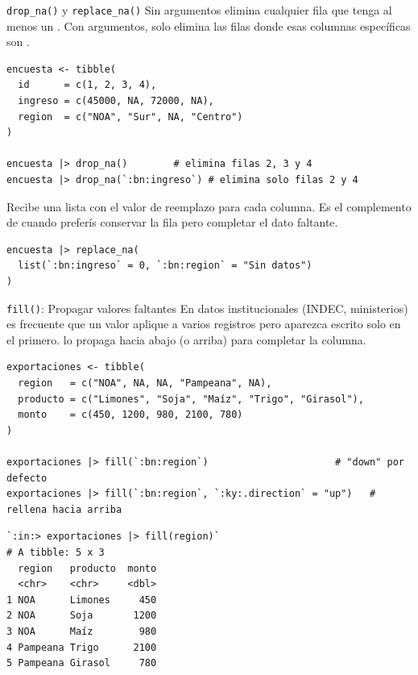 \documentclass[8pt]{beamer}
\begin{document}
	\begin{frame}[fragile]{\texttt{drop\_na()} y \texttt{replace\_na()}}
		Sin argumentos elimina cualquier fila que tenga al menos un . Con argumentos, solo elimina las filas donde esas columnas específicas son .
\begin{lstlisting}[style=RScript]
encuesta <- tibble(
  id      = c(1, 2, 3, 4),
  ingreso = c(45000, NA, 72000, NA),
  region  = c("NOA", "Sur", NA, "Centro")
)

encuesta |> drop_na()        # elimina filas 2, 3 y 4
encuesta |> drop_na(`:bn:ingreso`) # elimina solo filas 2 y 4
\end{lstlisting}

		Recibe una lista con el valor de reemplazo para cada columna. Es el complemento de  cuando preferís conservar la fila pero completar el dato faltante.
\begin{lstlisting}[style=RScript]
encuesta |> replace_na(
  list(`:bn:ingreso` = 0, `:bn:region` = "Sin datos")
)
\end{lstlisting}
	\end{frame}


	\begin{frame}[fragile]{\texttt{fill()}: Propagar valores faltantes}
		En datos institucionales (INDEC, ministerios) es frecuente que un valor aplique a varios registros pero aparezca escrito solo en el primero.  lo propaga hacia abajo (o arriba) para completar la columna.

\begin{lstlisting}[style=RScript]
exportaciones <- tibble(
  region   = c("NOA", NA, NA, "Pampeana", NA),
  producto = c("Limones", "Soja", "Maíz", "Trigo", "Girasol"),
  monto    = c(450, 1200, 980, 2100, 780)
)

exportaciones |> fill(`:bn:region`)                      # "down" por defecto
exportaciones |> fill(`:bn:region`, `:ky:.direction` = "up")   # rellena hacia arriba
\end{lstlisting}
\begin{lstlisting}[style=RConsole]
`:in:> exportaciones |> fill(region)`
# A tibble: 5 x 3
  region   producto  monto
  <chr>    <chr>     <dbl>
1 NOA      Limones     450
2 NOA      Soja       1200
3 NOA      Maíz        980
4 Pampeana Trigo      2100
5 Pampeana Girasol     780
\end{lstlisting}
	\end{frame}
\end{document}
